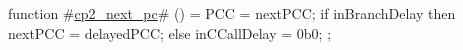 function #\hyperref[zcptwozynextzypc]{cp2\_next\_pc}# () = {
  PCC = nextPCC;
  if inBranchDelay then {
    nextPCC = delayedPCC;
  } else {
    inCCallDelay = 0b0;
  };
}
